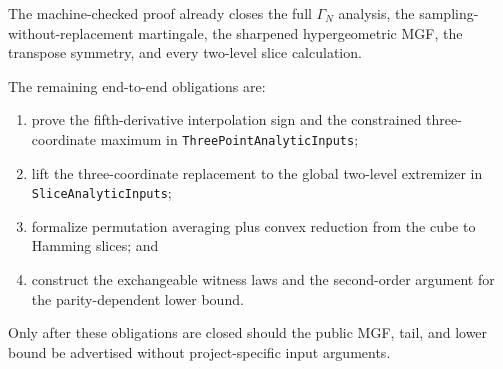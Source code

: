 The machine-checked proof already closes the full \(\Gamma_N\) analysis, the
sampling-without-replacement martingale, the sharpened hypergeometric MGF, the
transpose symmetry, and every two-level slice calculation.

The remaining end-to-end obligations are:
\begin{enumerate}
  \item prove the fifth-derivative interpolation sign and the constrained
  three-coordinate maximum in \texttt{ThreePointAnalyticInputs};
  \item lift the three-coordinate replacement to the global two-level
  extremizer in \texttt{SliceAnalyticInputs};
  \item formalize permutation averaging plus convex reduction from the cube to
  Hamming slices; and
  \item construct the exchangeable witness laws and the second-order argument
  for the parity-dependent lower bound.
\end{enumerate}

Only after these obligations are closed should the public MGF, tail, and lower
bound be advertised without project-specific input arguments.
